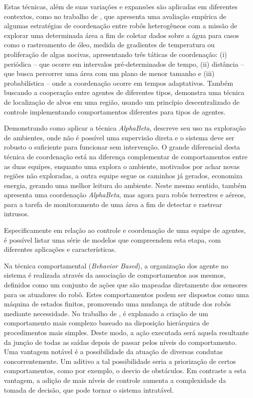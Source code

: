 Estas técnicas, além de suas variações e expansões são aplicadas em diferentes contextos, como no trabalho de \cite{Sujit2013}, que apresenta uma avaliação empírica de algumas estratégias de coordenação entre robôs heterogêneos com a missão de explorar uma determinada área a fim de coletar dados sobre a água para casos como o rastreamento de óleo, medida de gradientes de temperatura ou proliferação de algas nocivas, apresentando três táticas de coordenação:
(i) periódica -- que ocorre em intervalos pré-determinados de tempo,
(ii) distância -- que busca percorrer uma área com um plano de menor tamanho e
(iii) probabilística -- onde a coordenação ocorre em tempos adaptativos.
%
Também buscando a cooperação entre agentes de diferentes tipos, \cite{Grocholsky2006} demonstra uma técnica de localização de alvos em uma região, usando um princípio descentralizado de controle implementando comportamentos diferentes para tipos de agentes.

Demonstrando como aplicar a técnica \emph{AlphaBeta}, \cite{Goldsmith1998} descreve seu uso na exploração de ambientes, onde não é possível uma supervisão direta e o sistema deve ser robusto o suficiente para funcionar sem intervenção.
O grande diferencial desta técnica de coordenação está na diferença complementar de comportamentos entre as duas equipes, enquanto uma explora o ambiente, motivados por achar novas regiões não exploradas, a outra equipe segue os caminhos já gerados, economiza energia, gerando uma melhor leitura do ambiente.
Neste mesmo sentido, \cite{Tanner2007} também apresenta uma coordenação \textit{AlphaBeta}, mas agora para robôs terrestres e aéreos, para a tarefa de monitoramento de uma área a fim de detectar e rastrear intrusos.

Especificamente em relação ao controle e coordenação de uma equipe de agentes, é possível listar uma série de modelos que compreendem esta etapa, com diferentes aplicações e características.

Na técnica comportamental (\emph{Behavior Based}), a organização dos agente no sistema é realizada através da associação de comportamentos aos mesmos, definidos como um conjunto de ações que são mapeadas diretamente dos sensores para os atuadores do robô. Estes comportamentos podem ser dispostos como uma máquina de estados finitos, promovendo uma mudança de atitude dos robôs mediante necessidade.
No trabalho de \cite{Brooks1986}, é explanado a criação de um comportamento mais complexo baseado na disposição hierárquica de procedimentos mais simples. Deste modo, a ação executada será aquela resultante da junção de todas as saídas depois de passar pelos níveis do comportamento.
Uma vantagem notável é a possibilidade da atuação de diversas condutas concorrentemente. Um aditivo a tal possibilidade seria a priorização de certos comportamentos, como por exemplo, o desvio de obstáculos. Em contraste a esta vantagem, a adição de mais níveis de controle aumenta a complexidade da tomada de decisão, que pode tornar o sistema intratável.

